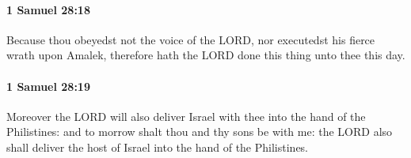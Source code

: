 		\paragraph{1 Samuel 28:18} %
			\label{1SAMUEL-28-18}

			Because thou obeyedst not the voice of the LORD, nor executedst his fierce wrath upon Amalek, therefore hath the LORD done this thing unto thee this day.


		\paragraph{1 Samuel 28:19} %
			\label{1SAMUEL-28-19}

			Moreover the LORD will also deliver Israel with thee into the hand of the Philistines: and to morrow shalt thou and thy sons be with me: the LORD also shall deliver the host of Israel into the hand of the Philistines.

